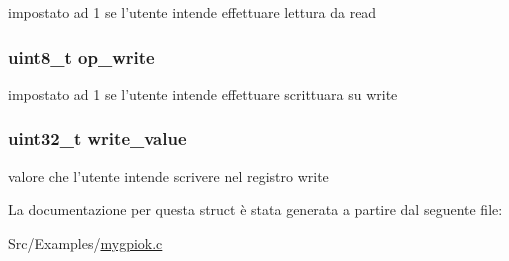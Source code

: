 impostato ad 1 se l'utente intende effettuare lettura da read 

\hypertarget{structparam__t_a67752de733f167918a4e966354183a69}{
\subsubsection[{op\+\_\+write}]{\setlength{\rightskip}{0pt plus 5cm}uint8\+\_\+t op\+\_\+write}}\label{structparam__t_a67752de733f167918a4e966354183a69}


impostato ad 1 se l'utente intende effettuare scrittuara su write 

\hypertarget{structparam__t_a09e0cff25312ab7f748a3063c038a2d9}{
\subsubsection[{write\+\_\+value}]{\setlength{\rightskip}{0pt plus 5cm}uint32\+\_\+t write\+\_\+value}}\label{structparam__t_a09e0cff25312ab7f748a3063c038a2d9}


valore che l'utente intende scrivere nel registro write 



La documentazione per questa struct è stata generata a partire dal seguente file\+:\begin{DoxyCompactItemize}
\item 
Src/\+Examples/\hyperlink{mygpiok_8c}{mygpiok.\+c}\end{DoxyCompactItemize}
